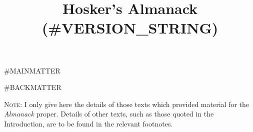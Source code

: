 \documentclass{amsbook}
\title{Hosker's Almanack (#VERSION_STRING)}
\begin{document}
\frontmatter

\maketitle

\tableofcontents


\renewcommand\chaptername{Month}

\mainmatter

\renewcommand\thesection{{\Roman{section}}}
\renewcommand\thefootnote{{\thesubsection.}}
\makeatletter
    \def\blfootnote{\xdef\@thefnmark{}\@footnotetext}
    \renewcommand{\@makefnmark}{\hbox{{{{\@thefnmark}}}}\hbox{{{{ }}}}}
\makeatother

#MAINMATTER


\renewcommand\thesection{{\arabic{section}}}
\renewcommand\thefootnote{{\arabic{section}}}

#BACKMATTER

\printbibliography[title={Sources}]

\bigskip

{\footnotesize \textsc{Note:} I only give here the details of those texts which provided material for the \textit{Almanack} proper. Details of other texts, such as those quoted in the Introduction, are to be found in the relevant footnotes.}
\end{document}
